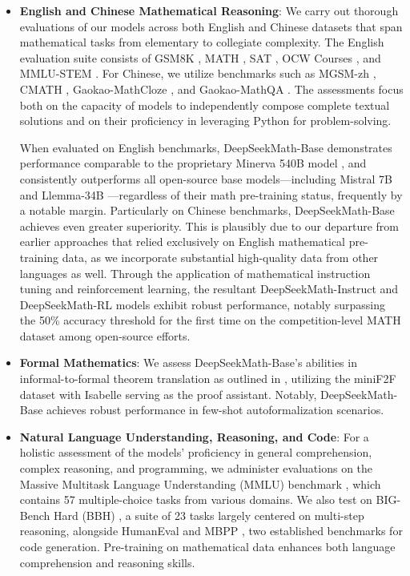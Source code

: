 \begin{itemize}[topsep=0pt]
    \item \textbf{English and Chinese Mathematical Reasoning}: We carry out thorough evaluations of our models across both English and Chinese datasets that span mathematical tasks from elementary to collegiate complexity. The English evaluation suite consists of GSM8K \citep{gsm8k}, MATH \citep{MATH}, SAT \citep{llemma}, OCW Courses \citep{minerva}, and MMLU-STEM \citep{mmlu}. For Chinese, we utilize benchmarks such as MGSM-zh \citep{mgsm}, CMATH \citep{wei2023cmath}, Gaokao-MathCloze \citep{agieval}, and Gaokao-MathQA \citep{agieval}. The assessments focus both on the capacity of models to independently compose complete textual solutions and on their proficiency in leveraging Python for problem-solving.

When evaluated on English benchmarks, DeepSeekMath-Base demonstrates performance comparable to the proprietary Minerva 540B model \citep{minerva}, and consistently outperforms all open-source base models—including Mistral 7B \citep{mistral} and Llemma-34B \citep{llemma}—regardless of their math pre-training status, frequently by a notable margin. Particularly on Chinese benchmarks, DeepSeekMath-Base achieves even greater superiority. This is plausibly due to our departure from earlier approaches \citep{minerva,llemma} that relied exclusively on English mathematical pre-training data, as we incorporate substantial high-quality data from other languages as well. Through the application of mathematical instruction tuning and reinforcement learning, the resultant DeepSeekMath-Instruct and DeepSeekMath-RL models exhibit robust performance, notably surpassing the 50\% accuracy threshold for the first time on the competition-level MATH dataset among open-source efforts.

\item \textbf{Formal Mathematics}: We assess DeepSeekMath-Base's abilities in informal-to-formal theorem translation as outlined in \citep{dsp_proof}, utilizing the miniF2F dataset \citep{minif2f} with Isabelle \citep{isabelle} serving as the proof assistant. Notably, DeepSeekMath-Base achieves robust performance in few-shot autoformalization scenarios.
\item \textbf{Natural Language Understanding, Reasoning, and Code}: For a holistic assessment of the models' proficiency in general comprehension, complex reasoning, and programming, we administer evaluations on the Massive Multitask Language Understanding (MMLU) benchmark \citep{mmlu}, which contains 57 multiple-choice tasks from various domains. We also test on BIG-Bench Hard (BBH) \citep{bbh}, a suite of 23 tasks largely centered on multi-step reasoning, alongside HumanEval \citep{codex} and MBPP \citep{mbpp}, two established benchmarks for code generation. Pre-training on mathematical data enhances both language comprehension and reasoning skills.


\end{itemize}
